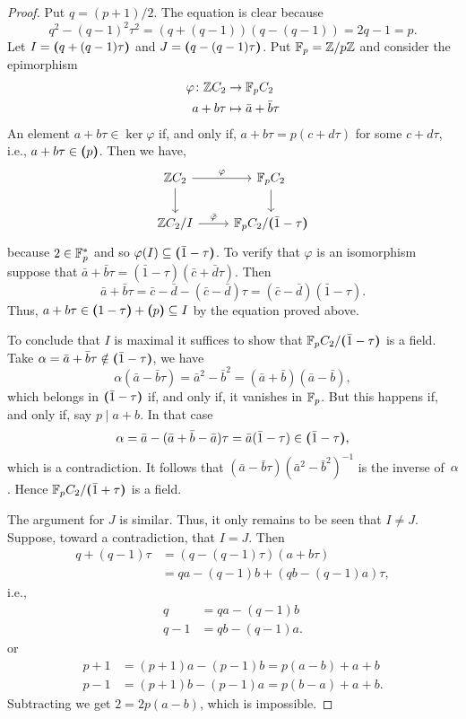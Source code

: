 \begin{proof} Put $q=(p+1)/2$. 
    The equation is clear because
    $$
        q^2 - (q-1)^2\tau^2 = (q+(q-1))(q-(q-1))=2q-1=p.
    $$
    Let $I=\textrm{\boldmath$($}q+(q-1)\tau\textrm{\boldmath$)$}$ and $J=\textrm{\boldmath$($}q-(q-1)\tau\textrm{\boldmath$)$}$. Put $\mathbb{F}_p=\mathbb{Z}/p\mathbb{Z}$ and consider the epimorphism
    \begin{align*}
        \varphi\colon\mathbb{Z} C_2&\to \mathbb{F}_p C_2\\
        a+b\tau&\mapsto\bar a +\bar b\tau
    \end{align*}
    An element $a+b\tau\in\ker\varphi$ if, and only if, $a+b\tau=p(c+d\tau)$ for some $c+d\tau$, i.e., $a+b\tau\in\textrm{\boldmath$($}p\textrm{\boldmath$)$}$. Then we have,
    $$
        \begin{tikzcd}
            \Z C_2
                    \arrow[r,"\varphi"]
                    \arrow[d]
                &\F_p C_2
                    \arrow[d]\\
            \Z C_2/I
                    \arrow[r,"\bar\varphi"]
                &\F_p C_2/\gen{\bar1-\tau}
        \end{tikzcd}
    $$
    because $2\in \mathbb{F}_p^*$ and so $\varphi(I)\subseteq\textrm{\boldmath$($}\bar1-\tau\textrm{\boldmath$)$}$. To verify that $\varphi$ is an isomorphism suppose that $\bar a +\bar b\tau=(\bar1-\tau)(\bar c + \bar d\tau)$. Then
    $$
        \bar a + \bar b\tau = \bar c - \bar d - (\bar c - \bar d)\tau
            =(\bar c - \bar d)(\bar 1 - \tau).
    $$
    Thus,
    $a + b\tau \in\textrm{\boldmath$($}1-\tau\textrm{\boldmath$)$}+\textrm{\boldmath$($}p\textrm{\boldmath$)$}\subseteq I$ by the equation proved above.

    To conclude that $I$ is maximal it suffices to show that $\mathbb{F}_p C_2/\textrm{\boldmath$($}\bar1-\tau\textrm{\boldmath$)$}$ is a field. Take $\alpha=\bar a+\bar b\tau\notin\textrm{\boldmath$($}\bar1-\tau\textrm{\boldmath$)$}$, we have
    $$
        \alpha(\bar a-\bar b\tau) = \bar a^2-\bar b^2=(\bar a+\bar b)(\bar a-\bar b),
    $$
    which belongs in $\textrm{\boldmath$($}\bar1-\tau\textrm{\boldmath$)$}$ if, and only if, it vanishes in $\mathbb{F}_p$. But this happens if, and only if, say $p\mid a+b$. In that case
    $$
        \alpha = \bar a - (\bar a + \bar b - \bar a)\tau = \bar a(\bar1-\tau)\in\textrm{\boldmath$($}\bar1-\tau\textrm{\boldmath$)$},
    $$
    which is a contradiction. It follows that $(\bar a-\bar b\tau)(\bar a^2-\bar b^2)^{-1}$ is the inverse of~$\alpha$. Hence $\mathbb{F}_p C_2/\textrm{\boldmath$($}\bar1+\tau\textrm{\boldmath$)$}$ is a field.
    
    The argument for $J$ is similar. Thus, it only remains to be seen that $I\ne J$. Suppose, toward a contradiction, that $I=J$. Then
    \begin{align*}
        q+(q-1)\tau
            &= (q-(q-1)\tau)(a+b\tau)\\
            &= qa-(q-1)b + (qb-(q-1)a)\tau,
    \end{align*}
    i.e.,
    \begin{align*}
        q &= qa - (q-1)b\\
        q-1 &= qb - (q-1)a. 
    \end{align*}
    or
    \begin{align*}
        p+1 &= (p+1)a - (p-1)b = p(a-b)+a+b\\
        p-1 &= (p+1)b - (p-1)a = p(b-a)+a+b. 
    \end{align*}
    Subtracting we get $2=2p(a-b)$, which is impossible. 
\end{proof}

